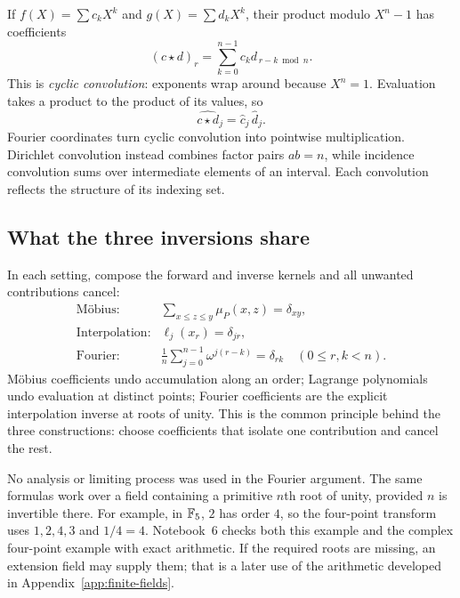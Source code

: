 If $f(X)=\sum c_kX^k$ and $g(X)=\sum d_kX^k$, their product modulo
$X^n-1$ has coefficients
\[
 (c\star d)_r=\sum_{k=0}^{n-1}c_kd_{\,r-k\bmod n}.
\]
This is \emph{cyclic convolution}: exponents wrap around because
$X^n=1$. Evaluation takes a product to the product of its values, so
\[
 \widehat{c\star d}_j=\widehat c_j\,\widehat d_j.
\]
Fourier coordinates turn cyclic convolution into pointwise multiplication.
Dirichlet convolution instead combines factor pairs $ab=n$, while
incidence convolution sums over intermediate elements of an interval.
Each convolution reflects the structure of its indexing set.

\subsection{What the three inversions share}

In each setting, compose the forward and inverse kernels and all
unwanted contributions cancel:
\[
 \begin{array}{ll}
 \text{M\"obius:}&\displaystyle
   \sum_{x\le z\le y}\mu_P(x,z)=\delta_{xy},\\[6pt]
 \text{Interpolation:}&\ell_j(x_r)=\delta_{jr},\\[4pt]
 \text{Fourier:}&\displaystyle
   \frac1n\sum_{j=0}^{n-1}\omega^{j(r-k)}=\delta_{rk}
   \quad(0\le r,k<n).
 \end{array}
\]
M\"obius coefficients undo accumulation along an order; Lagrange
polynomials undo evaluation at distinct points; Fourier coefficients
are the explicit interpolation inverse at roots of unity.
This is the common principle behind the three constructions:
choose coefficients that isolate one contribution and cancel the rest.

\begin{labbox}[breakable=false]
No analysis or limiting process was used in the Fourier argument.
The same formulas work over a field containing a primitive $n$th root
of unity, provided $n$ is invertible there. For example, in $\mathbb F_5$,
$2$ has order $4$, so the four-point transform uses $1,2,4,3$
and $1/4=4$. Notebook~6 checks both this example and the complex
four-point example with exact arithmetic. If the required roots are
missing, an extension field may supply them; that is a later use
of the arithmetic developed in Appendix~\ref{app:finite-fields}.
\end{labbox}
